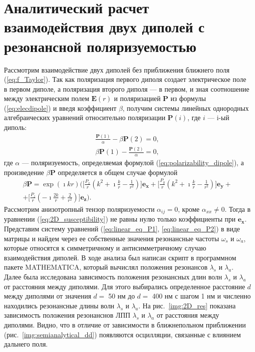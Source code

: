 \section{Аналитический расчет взаимодействия двух диполей с резонансной поляризуемостью}
Рассмотрим взаимодействие двух диполей без приближения ближнего поля (\ref{eq:f_Taylor}). Так как поляризация первого диполя создает электрическое поле в первом диполе, а поляризация второго диполя --- в первом, и зная соотношение между электрическим полем $ \textbf{E} (r) $ и поляризацией $ \textbf{P} $ из формулы (\ref{eq:elecdipole}) и введя коэффициент $ \beta $, получим системы линейных однородных алгебраических уравнений относительно поляризации $ \textbf{P} (i) $, где $ i $ --- i-ый диполь:
\begin{subequations}
\begin{gather}
\frac{\mathbf{P}(1)}{\alpha} - \beta \mathbf{P}(2) = 0, \label{eq:linear_eq_P1} \\
\beta \mathbf{P}(1) -  \frac{\mathbf{P}(2)}{\alpha} = 0, \label{eq:linear_eq_P2} 
\end{gather}
\end{subequations}
где $ \alpha $ --- поляризуемость, определяемая формулой (\ref{eq:polarizability_dipole}), а произведение $ \beta \textbf{P} $ определяется в общем случае формулой
\begin{multline}
\beta \mathbf{P} = \exp (\imath k r) \Bigg( \Bigg[ \frac{P_x}{r} \left( k^2 + \imath \frac{k}{r} - \frac{1}{r^2} \right) \Bigg] \mathbf{e_x} + \Bigg[ \frac{P_y}{r} \left( k^2 + \imath \frac{k}{r} - \frac{1}{r^2} \right) \Bigg] \mathbf{e_y} + \\
+ \Bigg[ \frac{P_z}{r} \left( - \imath \frac{2 k}{r} + \frac{2}{r^2} \right) \Bigg] \mathbf{e_z} \Bigg).
\label{eq:2D_susceptibility}
\end{multline}
Рассмотрим анизотропный тензор поляризуемости $ \alpha_{ij} = 0 $, кроме $ \alpha_{xx} \neq 0 $. Тогда в уравнении (\ref{eq:2D_susceptibility}) не равны нулю только коэффициенты при $ \mathbf{e_x} $. Представим систему уравнений (\ref{eq:linear_eq_P1}, \ref{eq:linear_eq_P2}) в виде матрицы и найдем через ее собственные значения резонансные частоты $ \omega_s $ и $ \omega_a $, которые относятся к симметричному и антисимметричному случаю взаимодействия диполей. В ходе анализа был написан скрипт в программном пакете MATHEMATICA, который вычислял положения резонансов $ \lambda_s $ и $ \lambda_a $. Далее была исследована зависимость положения резонансных длин волн $ \lambda_s $ и $ \lambda_a $ от расстояния между диполями. Для этого выбирались определенное расстояние $ d $ между диполями от значения $ d = $ 50 нм до $ d = $ 400 нм с шагом 1 нм и численно находились резонансные длины волн  $ \lambda_s $ и $ \lambda_a $. На рис.~\ref{img:2D_res} показана зависимость положения резонанснов ЛПП $ \lambda_s $ и $ \lambda_a $ от расстояния между диполями. Видно, что в отличие от зависимости в ближнепольном приближении (рис.~\ref{img:semianalytical_dd}) появляются осцилляции, связанные с влиянием дальнего поля.
